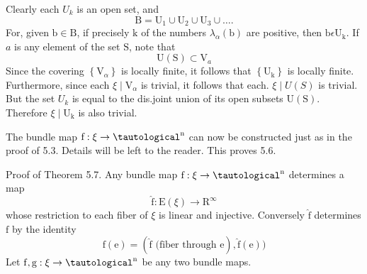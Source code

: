 \documentclass[10pt]{article}
\begin{document}
Clearly each $U_{k}$ is an open set, and
$$
\mathrm{B}=\mathrm{U}_{1} \cup \mathrm{U}_{2} \cup \mathrm{U}_{3} \cup \ldots .
$$
For, given $\mathrm{b} \in \mathrm{B}$, if precisely $\mathrm{k}$ of the numbers $\lambda_{\alpha}(\mathrm{b})$ are positive, then $\mathrm{b} \epsilon \mathrm{U}_{\mathrm{k}} .$ If $a$ is any element of the set $\mathrm{S}$, note that
$$
\mathrm{U}(\mathrm{S}) \subset \mathrm{V}_{a}
$$
Since the covering $\left\{\mathrm{V}_{\alpha}\right\}$ is locally finite, it follows that $\left\{\mathrm{U}_{\mathrm{k}}\right\}$ is locally finite. Furthermore, since each $\xi \mid \mathrm{V}_{\alpha}$ is trivial, it follows that each. $\xi \mid U(S)$ is trivial. But the set $U_{k}$ is equal to the dis.joint union of its open subsets $\mathrm{U}(\mathrm{S})$. Therefore $\xi \mid \mathrm{U}_{\mathrm{k}}$ is also trivial.

The bundle map $\mathrm{f}: \xi \rightarrow \tautological^{\mathrm{n}}$ can now be constructed just as in the proof of 5.3. Details will be left to the reader. This proves 5.6.

Proof of Theorem 5.7. Any bundle map $\mathrm{f}: \xi \rightarrow \tautological^{\mathrm{n}}$ determines a map
$$
\widehat{\mathrm{f}}: \mathrm{E}(\xi) \rightarrow \mathrm{R}^{\infty}
$$
whose restriction to each fiber of $\xi$ is linear and injective. Conversely $\widehat{\mathrm{f}}$ determines $\mathrm{f}$ by the identity
$$
\mathrm{f}(\mathrm{e})=(\hat{\mathrm{f}} \text { (fiber through } \mathrm{e}), \hat{\mathrm{f}}(\mathrm{e}))
$$
Let $\mathrm{f}, \mathrm{g}: \xi \rightarrow \tautological^{\mathrm{n}}$ be any two bundle maps.
\end{document}
